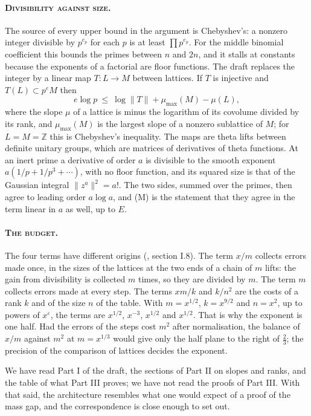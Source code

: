 \paragraph{\normalfont\scshape Divisibility against size.} The source of every upper bound in the argument is Chebyshev's: a nonzero integer divisible by $p^{e_p}$ for each $p$ is at least $\prod p^{e_p}$. For the middle binomial coefficient this bounds the primes between $n$ and $2n$, and it stalls at constants because the exponents of a factorial are floor functions. The draft replaces the integer by a linear map $T:L\to M$ between lattices. If $T$ is injective and $T(L)\subset p^eM$ then
\[
e\log p\ \le\ \log\|T\|+\mu_{\max}(M)-\mu(L),
\]
where the slope $\mu$ of a lattice is minus the logarithm of its covolume divided by its rank, and $\mu_{\max}(M)$ is the largest slope of a nonzero sublattice of $M$; for $L=M=\mathbb Z$ this is Chebyshev's inequality. The maps are theta lifts between definite unitary groups, which are matrices of derivatives of theta functions. At an inert prime a derivative of order $a$ is divisible to the smooth exponent $a(1/p+1/p^3+\cdots)$, with no floor function, and its squared size is that of the Gaussian integral $\|z^a\|^2=a!$. The two sides, summed over the primes, then agree to leading order $a\log a$, and (M) is the statement that they agree in the term linear in $a$ as well, up to $E$.

\paragraph{\normalfont\scshape The budget.} The four terms have different origins (\cite{Rub26}, section I.8). The term $x/m$ collects errors made once, in the sizes of the lattices at the two ends of a chain of $m$ lifts: the gain from divisibility is collected $m$ times, so they are divided by $m$. The term $m$ collects errors made at every step. The terms $xm/k$ and $k/n^2$ are the costs of a rank $k$ and of the size $n$ of the table. With $m=x^{1/2}$, $k=x^{9/2}$ and $n=x^2$, up to powers of $x^\varepsilon$, the terms are $x^{1/2}$, $x^{-3}$, $x^{1/2}$ and $x^{1/2}$. That is why the exponent is one half. Had the errors of the steps cost $m^2$ after normalisation, the balance of $x/m$ against $m^2$ at $m=x^{1/3}$ would give only the half plane to the right of $\frac23$; the precision of the comparison of lattices decides the exponent.

We have read Part I of the draft, the sections of Part II on slopes and ranks, and the table of what Part III proves; we have not read the proofs of Part III. With that said, the architecture resembles what one would expect of a proof of the mass gap, and the correspondence is close enough to set out.

